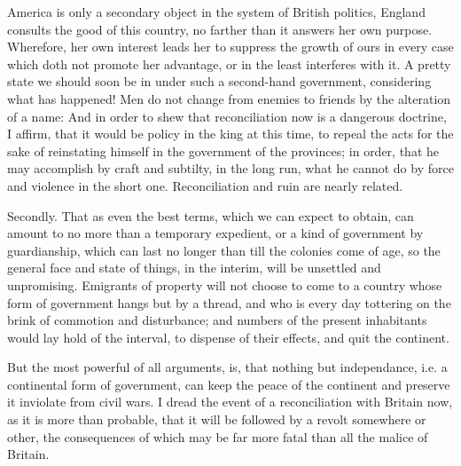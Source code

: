 \documentclass[12pt,oneside]{memoir}
\begin{document}
America is only a secondary object in the system of British politics,
England consults the good of this country, no farther than it
answers her own purpose. Wherefore, her own interest leads her to
suppress the growth of ours in every case which doth not promote her
advantage, or in the least interferes with it. A pretty state we
should soon be in under such a second-hand government, considering
what has happened! Men do not change from enemies to friends by the
alteration of a name: And in order to shew that reconciliation now
is a dangerous doctrine, I affirm, that it would be policy in the
king at this time, to repeal the acts for the sake of reinstating
himself in the government of the provinces; in order, that he may
accomplish by craft and subtilty, in the long run, what he cannot do
by force and violence in the short one. Reconciliation and ruin are
nearly related.

Secondly. That as even the best terms, which we can expect to obtain,
can amount to no more than a temporary expedient, or a kind of
government by guardianship, which can last no longer than till the
colonies come of age, so the general face and state of things, in
the interim, will be unsettled and unpromising. Emigrants of
property will not choose to come to a country whose form of
government hangs but by a thread, and who is every day tottering on
the brink of commotion and disturbance; and numbers of the present
inhabitants would lay hold of the interval, to dispense of their
effects, and quit the continent.

But the most powerful of all arguments, is, that nothing but
independance, i.e. a continental form of government, can keep the
peace of the continent and preserve it inviolate from civil wars. I
dread the event of a reconciliation with Britain now, as it is more
than probable, that it will be followed by a revolt somewhere or
other, the consequences of which may be far more fatal than all the
malice of Britain.
\end{document}
